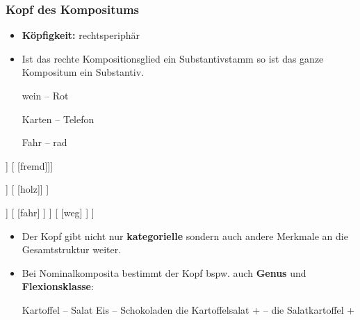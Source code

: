 \begin{frame}
\frametitle{Kopf des Kompositums}

\begin{itemize}
\item \textbf{Köpfigkeit:} rechtsperiphär

\item Ist das rechte Kompositionsglied ein Substantivstamm so ist das ganze Kompositum ein Substantiv.

\ea 
\ea wein -- Rot

\ex Karten -- Telefon

\ex Fahr -- rad
\z
\z 

\end{itemize}

\begin{minipage}[t]{0.32\textwidth}
\centering
\begin{forest}
	[\alertred{A}
	[N
	[welt]]
	[
	[fremd]]]
\end{forest}%
\end{minipage}
%
%
\begin{minipage}[t]{0.32\textwidth}
\centering
\begin{forest}
	[\alertred{N}
	[A
	[klein]]
	[
	[holz]]
	]
\end{forest}%
\end{minipage}
%
%
\begin{minipage}[t]{0.34\textwidth}
\centering
\begin{forest}
	[\alertred{N}
	[\alertblue{V}
	[N
	[rad]
	]
	[
	[fahr]
	]
	]
	[
	[weg]
	]
	]
\end{forest}
\end{minipage}

\end{frame}


\begin{frame}

\begin{itemize}
\item Der Kopf gibt nicht nur \textbf{kategorielle} sondern auch andere Merkmale an die Gesamtstruktur weiter.
\item Bei Nominalkomposita bestimmt der Kopf bspw. auch \textbf{Genus} und \textbf{Flexionsklasse}:

\eal 
\ex {} Kartoffel --  Salat
\ex {} Eis --  Schokoladen
\ex die Kartoffelsalat +  -- die Salatkartoffel + 

\zl

\end{itemize}
\end{frame}


